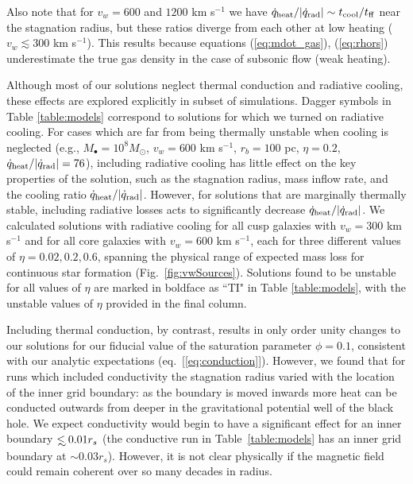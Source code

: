 \documentclass[usenatbib,fleqn]{mn2e}
\newcommand\lsim{\mathrel{\rlap{\lower4pt\hbox{\hskip1pt$\sim$}}
    \raise1pt\hbox{$<$}}}
\newcommand{\rs}{r_s}
\begin{document}
Also note that for $v_{w}=600$ and $1200$ km s$^{-1}$ we have
$\dot{q}_{\rm heat}/|\dot{q}_{\rm rad}| \sim t_{\rm cool}/t_{\rm ff}$
near the stagnation radius, but these ratios diverge from each other
at low heating ($v_{w} \lesssim 300$ km s$^{-1}$).  This results
because equations (\ref{eq:mdot_gas}), (\ref{eq:rhors}) underestimate
the true gas density in the case of subsonic flow (weak heating).

Although most of our solutions neglect thermal conduction and
radiative cooling, these effects are explored explicitly in subset of
simulations.  Dagger symbols in Table \ref{table:models} correspond to
solutions for which we turned on radiative cooling.  For cases which
are far from being thermally unstable when cooling is neglected (e.g.,
$M_{\bullet} = 10^{8}M_{\odot}$, $v_{w} = 600$ km s$^{-1}$, $r_{b} =
100$ pc, $\eta = 0.2$, $\dot{q}_{\rm heat}/|\dot{q}_{\rm rad}| = 76$),
including radiative cooling has little effect on the key properties of
the solution, such as the stagnation radius, mass inflow rate, and
the cooling ratio $\dot{q}_{\rm heat}/|\dot{q}_{\rm rad}|$.  However,
for solutions that are marginally thermally stable, including
radiative losses acts to significantly decrease $\dot{q}_{\rm
  heat}/|\dot{q}_{\rm rad}|$.  We calculated solutions with radiative
cooling for all cusp galaxies with $v_w=300$ km s$^{-1}$ and for all
core galaxies with $v_w=600 $ km s$^{-1}$, each for three different
values of $\eta = 0.02, 0.2, 0.6$, spanning the physical range of
expected mass loss for continuous star formation
(Fig.~\ref{fig:vwSources}).  Solutions found to be unstable for all
values of $\eta$ are marked in boldface as ``TI" in Table
\ref{table:models}, with the unstable values of $\eta$ provided in the
final column.

Including thermal conduction, by contrast, results in only order unity
changes to our solutions for our fiducial value of the saturation
parameter $\phi = 0.1$, consistent with our analytic expectations
(eq.~[\ref{eq:conduction}]). However, we found that for runs which
included conductivity the stagnation radius varied with the location
of the inner grid boundary: as the boundary is moved inwards more heat
can be conducted outwards from deeper in the gravitational potential
well of the black hole. We expect conductivity would begin to have a
significant effect for an inner boundary $\lsim 0.01 \rs$ (the
conductive run in Table~\ref{table:models} has an inner grid boundary
at $\sim 0.03 \rs$). However, it is not clear physically if the
magnetic field could remain coherent over so many decades in radius.
\end{document}
